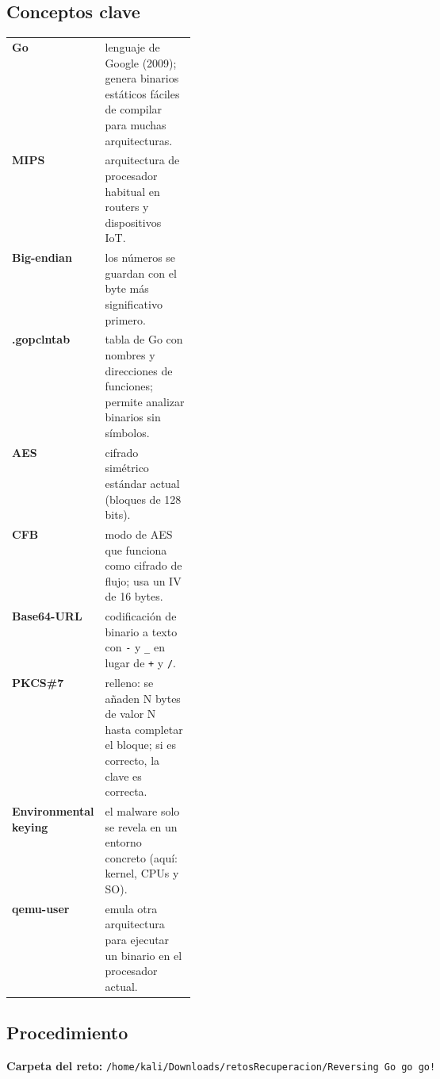 \documentclass[11pt,a4paper]{article}
\begin{document}
\subsection{Conceptos clave}
\begin{tabularx}{\linewidth}{@{}>{\raggedright\arraybackslash}p{0.27\linewidth}X@{}}
\toprule
\textbf{Go} & lenguaje de Google (2009); genera binarios estáticos fáciles de compilar para muchas arquitecturas. \\ 
\textbf{MIPS} & arquitectura de procesador habitual en routers y dispositivos IoT. \\ 
\textbf{Big-endian} & los números se guardan con el byte más significativo primero. \\ 
\textbf{.gopclntab} & tabla de Go con nombres y direcciones de funciones; permite analizar binarios sin símbolos. \\ 
\textbf{AES} & cifrado simétrico estándar actual (bloques de 128 bits). \\ 
\textbf{CFB} & modo de AES que funciona como cifrado de flujo; usa un IV de 16 bytes. \\ 
\textbf{Base64-URL} & codificación de binario a texto con \texttt{-} y \texttt{\_} en lugar de \texttt{+} y \texttt{/}. \\ 
\textbf{PKCS\#7} & relleno: se añaden N bytes de valor N hasta completar el bloque; si es correcto, la clave es correcta. \\ 
\textbf{Environmental keying} & el malware solo se revela en un entorno concreto (aquí: kernel, CPUs y SO). \\ 
\textbf{qemu-user} & emula otra arquitectura para ejecutar un binario en el procesador actual. \\ 
\bottomrule
\end{tabularx}

\subsection{Procedimiento}

\noindent\textbf{Carpeta del reto:} \texttt{/\allowbreak{}home/\allowbreak{}kali/\allowbreak{}Downloads/\allowbreak{}retosRecuperacion/\allowbreak{}Reversing Go go go!}
\end{document}
